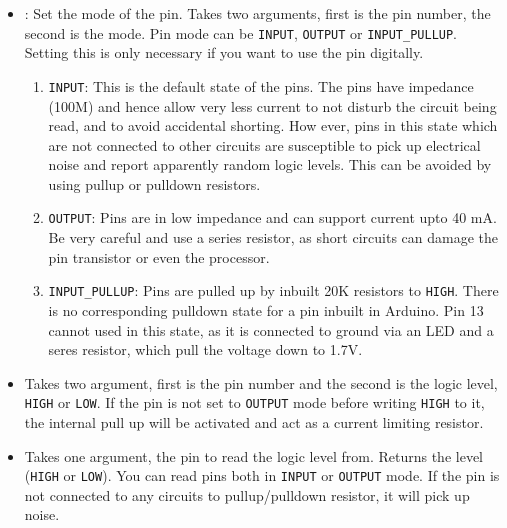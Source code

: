 \documentclass{article}
\begin{document}
		\begin{itemize}

			\item {}: Set the mode of the pin. Takes two arguments, first is the pin number, the second is the mode. Pin mode can be \texttt{INPUT}, \texttt{OUTPUT} or \texttt{INPUT\_PULLUP}. Setting this is only necessary if you want to use the pin digitally.
			\begin{enumerate}
				
				\item[] \texttt{INPUT}: This is the default state of the pins. The pins have impedance (100M) and hence allow very less current to not disturb the circuit being read, and to avoid accidental shorting. How ever, pins in this state which are not connected to other circuits are susceptible to pick up electrical noise and report apparently random logic levels. This can be avoided by using pullup or pulldown resistors.

				\item[] \texttt{OUTPUT}: Pins are in low impedance and can support current upto 40 mA. Be very careful and use a series resistor, as short circuits can damage the pin transistor or even the processor.

				\item[] \texttt{INPUT\_PULLUP}: Pins are  pulled up by inbuilt 20K resistors to \texttt{HIGH}. There is no corresponding pulldown state for a pin inbuilt in Arduino. Pin 13 cannot used in this state, as it is connected to ground via an LED and a seres resistor, which pull the voltage down to 1.7V. 

			\end{enumerate}

			\item {} Takes two argument, first is the pin number and the second is the logic level, \texttt{HIGH} or \texttt{LOW}. If the pin is not set to \texttt{OUTPUT} mode before writing \texttt{HIGH} to it, the internal pull up will be activated and act as a current limiting resistor.
			\item {} Takes one argument, the pin to read the logic level from. Returns the level (\texttt{HIGH} or \texttt{LOW}). You can read pins both in \texttt{INPUT} or \texttt{OUTPUT} mode. If the pin is not connected to any circuits to pullup/pulldown resistor, it will pick up noise.

		\end{itemize}
\end{document}
